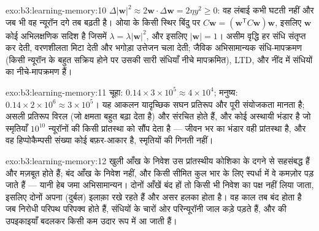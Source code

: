 \begin{solution}{exo:b3:learning-memory:10}
$\Delta|\mathbf{w}|^{2} \approx 2\mathbf{w}\cdot\Delta\mathbf{w} = 2\eta
y^{2} \ge 0$: वह लंबाई कभी घटती नहीं और जब भी वह न्यूरॉन दगे तब बढ़ती
है। ओया के किसी स्थिर बिंदु पर $C\mathbf{w} = (\mathbf{w}^{\mathsf{T}}C
\mathbf{w})\mathbf{w}$, इसलिए $\mathbf{w}$ कोई अभिलक्षणिक सदिश है जिसमें
$\lambda =
\lambda|\mathbf{w}|^{2}$, और इसलिए $|\mathbf{w}| = 1$। असीम वृद्धि हर
संधि संतृप्त कर देती, वरणशीलता मिटा देती और भगोड़ा उत्तेजन चला देती;
जैविक अभिसामान्यक संधि-मापक्रमण (किसी न्यूरॉन के बहुत सक्रिय होने पर
उसकी सारी संधियाँ नीचे मापक्रमित), LTD, और नींद में संधियों का
नीचे-मापक्रमण हैं।
\end{solution}

\begin{solution}{exo:b3:learning-memory:11}
चूहा: $0.14\times 3\times 10^{5} \approx 4\times 10^{4}$; मनुष्य: $0.14
\times 2\times 10^{6} \approx 3\times 10^{5}$। यह आकलन यादृच्छिक सघन
प्रतिरूप और पूरी संयोजकता मानता है; असली प्रतिरूप विरल (जो क्षमता बहुत
बढ़ा देता है) और संरचित होते हैं, और  कोई अस्थायी भंडार है
जो स्मृतियाँ $10^{10}$ न्यूरॉनों की किसी प्रांतस्था को सौंप देता है ---
जीवन भर का भंडार वही प्रांतस्था है, और वह हिप्पोकैम्पसी संख्या कोई
बफ़र-आकार है, स्मृतियों की गिनती नहीं।
\end{solution}

\begin{solution}{exo:b3:learning-memory:12}
खुली आँख के निवेश उस प्रांतस्थीय कोशिका के दगने से सहसंबद्ध हैं और
मज़बूत होते हैं; बंद आँख के निवेश नहीं, और किसी सीमित कुल भार के लिए
स्पर्धा में वे कमज़ोर पड़ जाते हैं --- यानी हेब जमा अभिसामान्यन। दोनों
आँखें बंद हों तो किसी भी निवेश का पक्ष नहीं लिया जाता, इसलिए दोनों
अपना (दुर्बल) इलाक़ा रखे रहते हैं और असर हलका होता है। वह काल तब बंद
होता है जब निरोधी परिपथ परिपक्व होते हैं, संधियों के चारों ओर
परिन्यूरॉनी जाल कड़े पड़ते हैं, और  की उपइकाइयाँ बदलकर किसी
कम उदार रूप में आ जाती हैं।
\end{solution}

